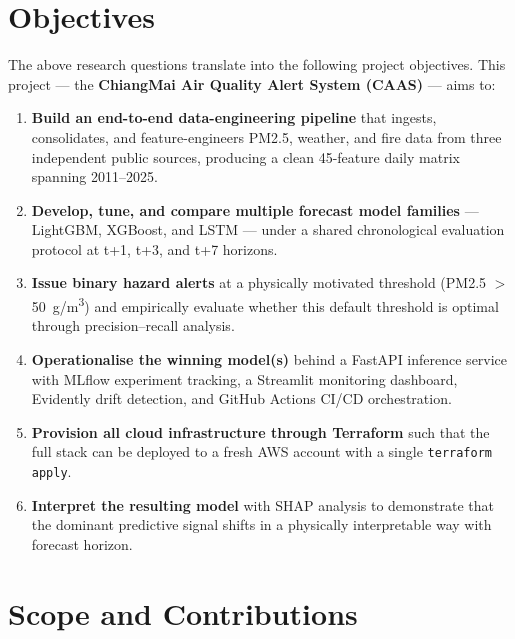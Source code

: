 \section{Objectives}

The above research questions translate into the following project
objectives. This project --- the
\textbf{ChiangMai Air Quality Alert System (CAAS)} --- aims to:

\begin{enumerate}
    \item \textbf{Build an end-to-end data-engineering pipeline} that
          ingests, consolidates, and feature-engineers PM2.5, weather, and
          fire data from three independent public sources, producing a
          clean 45-feature daily matrix spanning 2011--2025.

    \item \textbf{Develop, tune, and compare multiple forecast model
          families} --- LightGBM, XGBoost, and LSTM --- under a shared
          chronological evaluation protocol at t+1, t+3, and t+7 horizons.

    \item \textbf{Issue binary hazard alerts} at a physically motivated
          threshold (PM2.5 $>$ 50~\textmu g/m\textsuperscript{3}) and
          empirically evaluate whether this default threshold is optimal
          through precision--recall analysis.

    \item \textbf{Operationalise the winning model(s)} behind a FastAPI
          inference service with MLflow experiment tracking, a Streamlit
          monitoring dashboard, Evidently drift detection, and GitHub Actions
          CI/CD orchestration.

    \item \textbf{Provision all cloud infrastructure through Terraform}
          such that the full stack can be deployed to a fresh AWS account
          with a single \texttt{terraform apply}.

    \item \textbf{Interpret the resulting model} with SHAP analysis to
          demonstrate that the dominant predictive signal shifts in a
          physically interpretable way with forecast horizon.
\end{enumerate}

\section{Scope and Contributions}

